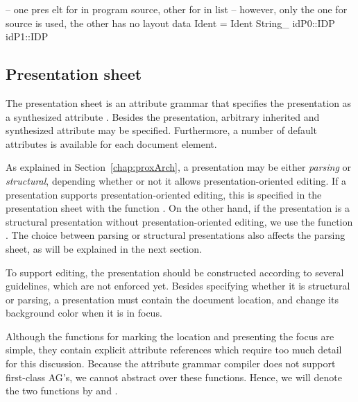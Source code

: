 -- one pres elt for in program source, other for in list
-- however, only the one for source is used, the other has no layout
data Ident = Ident String_                                 { idP0::IDP idP1::IDP }

\ec

\subsection{Presentation sheet}

The presentation sheet is an attribute grammar that specifies the presentation as a synthesized attribute . Besides the presentation, arbitrary inherited and synthesized attribute may be specified. Furthermore, a number of default attributes is available for each document element.


As explained in Section~\ref{chap:proxArch}, a presentation may be either {\em parsing} or {\em structural}, depending whether or not it allows presentation-oriented editing. If a presentation supports presentation-oriented editing, this is specified in the presentation sheet with the function . On the other hand, if the presentation is a structural presentation without presentation-oriented editing, we use the function .  The choice between parsing or structural presentations also affects the parsing sheet, as will be explained in the next section. 

To support editing, the presentation should be constructed according to several guidelines, which are not enforced yet. Besides specifying whether it is structural or parsing, a presentation must contain the document location, and change its background color when it is in focus. 

Although the functions for marking the location and presenting the focus are simple, they contain explicit attribute references which require too much detail for this discussion. Because the attribute grammar compiler does not support first-class AG's, we cannot abstract over these functions. Hence, we will denote the two functions by  and . 

